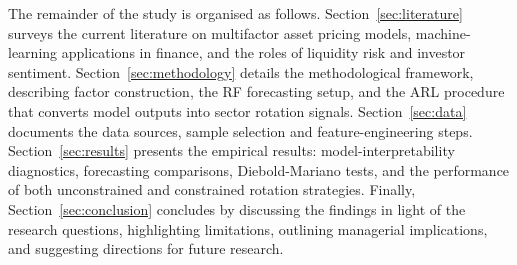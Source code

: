 The remainder of the study is organised as follows.  Section~\ref{sec:literature} surveys the current literature on multifactor asset pricing models, machine-learning applications in finance, and the roles of liquidity risk and investor sentiment.  Section~\ref{sec:methodology} details the methodological framework, describing factor construction, the RF forecasting setup, and the ARL procedure that converts model outputs into sector rotation signals.  Section~\ref{sec:data} documents the data sources, sample selection and feature-engineering steps. Section~\ref{sec:results} presents the empirical results: model-interpretability diagnostics, forecasting comparisons, Diebold-Mariano tests, and the performance of both unconstrained and constrained rotation strategies. Finally, Section~\ref{sec:conclusion} concludes by discussing the findings in light of the research questions, highlighting limitations, outlining managerial implications, and suggesting directions for future research.
